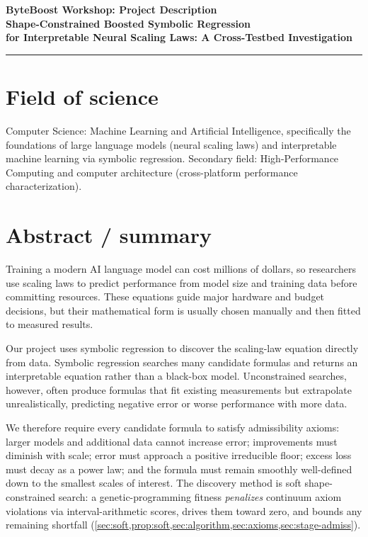 \documentclass[11pt]{article}
\theoremstyle{plain}
\theoremstyle{remark}
\begin{document}

\begin{center}
 {\Large\bfseries ByteBoost Workshop: Project Description}\\[6pt]
    {\large\bfseries Shape-Constrained Boosted Symbolic Regression\\
    for Interpretable Neural Scaling Laws: A Cross-Testbed Investigation}
\end{center}

\hrule
\vspace{6pt}

\section{Field of science}\label{sec:field}
Computer Science: Machine Learning and Artificial Intelligence, specifically the foundations of large language models (neural scaling laws) and interpretable machine learning via symbolic regression. Secondary field: High-Performance Computing and computer architecture (cross-platform performance characterization).

\section{Abstract / summary}\label{sec:abstract}

Training a modern AI language model can cost millions of dollars, so researchers use scaling laws to predict performance from model size and training data before committing resources. These equations guide major hardware and budget decisions, but their mathematical form is usually chosen manually and then fitted to measured results.

Our project uses symbolic regression to discover the scaling-law equation directly from data. Symbolic regression searches many candidate formulas and returns an interpretable equation rather than a black-box model. Unconstrained searches, however, often produce formulas that fit existing measurements but extrapolate unrealistically, predicting negative error or worse performance with more data.

We therefore require every candidate formula to satisfy admissibility axioms: larger models and additional data cannot increase error; improvements must diminish with scale; error must approach a positive irreducible floor; excess loss must decay as a power law; and the formula must remain smoothly well-defined down to the smallest scales of interest. The discovery method is soft shape-constrained search: a genetic-programming fitness \emph{penalizes} continuum axiom violations via interval-arithmetic scores, drives them toward zero, and bounds any remaining shortfall (\cref{sec:soft,prop:soft,sec:algorithm,sec:axioms,sec:stage-admiss}).
\end{document}
